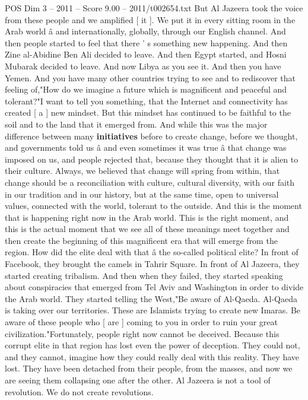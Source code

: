 \begin{textsample}{POS Dim 3 – 2011 – Score 9.00 – 2011/t002654.txt}
But Al Jazeera took the voice from these people and we amplified [ it ].
We put it in every sitting room in the Arab world â and internationally, globally, through our English channel.
And then people started to feel that there ' s something new happening.
And then Zine al-Abidine Ben Ali decided to leave.
And then Egypt started, and Hosni Mubarak decided to leave.
And now Libya as you see it.
And then you have Yemen.
And you have many other countries trying to see and to rediscover that feeling of,"How do we imagine a future which is magnificent and peaceful and tolerant?"I want to tell you something, that the Internet and connectivity has created [ a ] new mindset.
But this mindset has continued to be faithful to the soil and to the land that it emerged from.
And while this was the major difference between many \textbf{initiatives} before to create change, before we thought, and governments told us â and even sometimes it was true â that change was imposed on us, and people rejected that, because they thought that it is alien to their culture.
Always, we believed that change will spring from within, that change should be a reconciliation with culture, cultural diversity, with our faith in our tradition and in our history, but at the same time, open to universal values, connected with the world, tolerant to the outside.
And this is the moment that is happening right now in the Arab world.
This is the right moment, and this is the actual moment that we see all of these meanings meet together and then create the beginning of this magnificent era that will emerge from the region.
How did the elite deal with that â the so-called political elite?
In front of Facebook, they brought the camels in Tahrir Square.
In front of Al Jazeera, they started creating tribalism.
And then when they failed, they started speaking about conspiracies that emerged from Tel Aviv and Washington in order to divide the Arab world.
They started telling the West,"Be aware of Al-Qaeda.
Al-Qaeda is taking over our territories.
These are Islamists trying to create new Imaras.
Be aware of these people who [ are ] coming to you in order to ruin your great civilization."Fortunately, people right now cannot be deceived.
Because this corrupt elite in that region has lost even the power of deception.
They could not, and they cannot, imagine how they could really deal with this reality.
They have lost.
They have been detached from their people, from the masses, and now we are seeing them collapsing one after the other.
Al Jazeera is not a tool of revolution.
We do not create revolutions.

\end{textsample}

